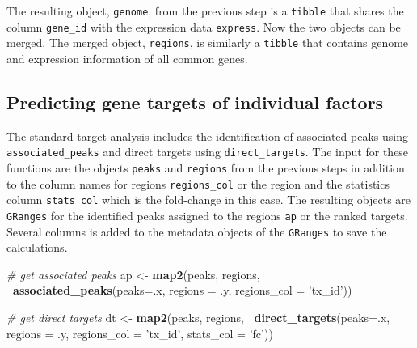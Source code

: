 \documentclass[9pt,a4paper,]{extarticle}
\newenvironment{Shaded}{\begin{snugshade}}{\end{snugshade}}
\newcommand{\CommentTok}[1]{\textcolor[rgb]{0.56,0.35,0.01}{\textit{#1}}}
\newcommand{\DataTypeTok}[1]{\textcolor[rgb]{0.13,0.29,0.53}{#1}}
\newcommand{\KeywordTok}[1]{\textcolor[rgb]{0.13,0.29,0.53}{\textbf{#1}}}
\newcommand{\NormalTok}[1]{#1}
\newcommand{\OperatorTok}[1]{\textcolor[rgb]{0.81,0.36,0.00}{\textbf{#1}}}
\newcommand{\OtherTok}[1]{\textcolor[rgb]{0.56,0.35,0.01}{#1}}
\newcommand{\StringTok}[1]{\textcolor[rgb]{0.31,0.60,0.02}{#1}}
\begin{document}
The resulting object, \texttt{genome}, from the previous step is a \texttt{tibble} that shares the column \texttt{gene\_id} with the expression data \texttt{express}. Now the two objects can be merged. The merged object, \texttt{regions}, is similarly a \texttt{tibble} that contains genome and expression information of all common genes.

\begin{Shaded}
\end{Shaded}

\hypertarget{predicting-gene-targets-of-individual-factors}{%
\subsection{Predicting gene targets of individual factors}\label{predicting-gene-targets-of-individual-factors}}

The standard target analysis includes the identification of associated peaks using \texttt{associated\_peaks} and direct targets using \texttt{direct\_targets}. The input for these functions are the objects \texttt{peaks} and \texttt{regions} from the previous steps in addition to the column names for regions \texttt{regions\_col} or the region and the statistics column \texttt{stats\_col} which is the fold-change in this case. The resulting objects are \texttt{GRanges} for the identified peaks assigned to the regions \texttt{ap} or the ranked targets. Several columns is added to the metadata objects of the \texttt{GRanges} to save the calculations.

\begin{Shaded}
\begin{Highlighting}[]
\CommentTok{# get associated peaks}
\NormalTok{ap <-}\StringTok{ }\KeywordTok{map2}\NormalTok{(peaks, regions,}
           \OperatorTok{~}\KeywordTok{associated_peaks}\NormalTok{(}\DataTypeTok{peaks=}\NormalTok{.x,}
                             \DataTypeTok{regions =}\NormalTok{ .y,}
                             \DataTypeTok{regions_col =} \StringTok{'tx_id'}\NormalTok{))}

\CommentTok{# get direct targets}
\NormalTok{dt <-}\StringTok{ }\KeywordTok{map2}\NormalTok{(peaks, regions,}
           \OperatorTok{~}\KeywordTok{direct_targets}\NormalTok{(}\DataTypeTok{peaks=}\NormalTok{.x,}
                           \DataTypeTok{regions =}\NormalTok{ .y,}
                           \DataTypeTok{regions_col =} \StringTok{'tx_id'}\NormalTok{,}
                           \DataTypeTok{stats_col =} \StringTok{'fc'}\NormalTok{))}
\end{Highlighting}
\end{Shaded}
\end{document}
